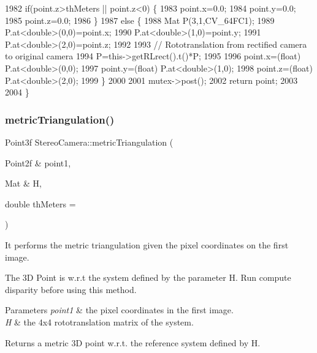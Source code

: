 \begin{DoxyCode}
1982     \textcolor{keywordflow}{if}(point.z>thMeters || point.z<0) \{
1983         point.x=0.0;
1984         point.y=0.0;
1985         point.z=0.0;
1986     \}
1987     \textcolor{keywordflow}{else} \{
1988         Mat P(3,1,CV\_64FC1);
1989         P.at<\textcolor{keywordtype}{double}>(0,0)=point.x;
1990         P.at<\textcolor{keywordtype}{double}>(1,0)=point.y;
1991         P.at<\textcolor{keywordtype}{double}>(2,0)=point.z;
1992 
1993         \textcolor{comment}{// Rototranslation from rectified camera to original camera}
1994         P=this->getRLrect().t()*P;
1995 
1996         point.x=(float) P.at<\textcolor{keywordtype}{double}>(0,0);
1997         point.y=(float) P.at<\textcolor{keywordtype}{double}>(1,0);
1998         point.z=(float) P.at<\textcolor{keywordtype}{double}>(2,0);
1999     \}
2000 
2001     mutex->post();
2002     \textcolor{keywordflow}{return} point;
2003 
2004 \}
\end{DoxyCode}
\mbox{\label{classStereoCamera_a3cf53fac6336eea107a26bd5cdbbdd03}} 
\subsubsection{\texorpdfstring{metric\+Triangulation()}{metricTriangulation()}\hspace{0.1cm}{\footnotesize\ttfamily [2/2]}}
{\footnotesize\ttfamily Point3f Stereo\+Camera\+::metric\+Triangulation (\begin{DoxyParamCaption}\item[{Point2f \&}]{point1,  }\item[{Mat \&}]{H,  }\item[{double}]{th\+Meters = {} }\end{DoxyParamCaption})}



It performs the metric triangulation given the pixel coordinates on the first image. 

The 3D Point is w.\+r.\+t the system defined by the parameter H. Run compute disparity before using this method. 
\begin{DoxyParams}{Parameters}
{\em point1} & the pixel coordinates in the first image. \\
\hline
{\em H} & the 4x4 rototranslation matrix of the system. \\
\hline
\end{DoxyParams}
\begin{DoxyReturn}{Returns}
a metric 3D point w.\+r.\+t. the reference system defined by H. 
\end{DoxyReturn}


